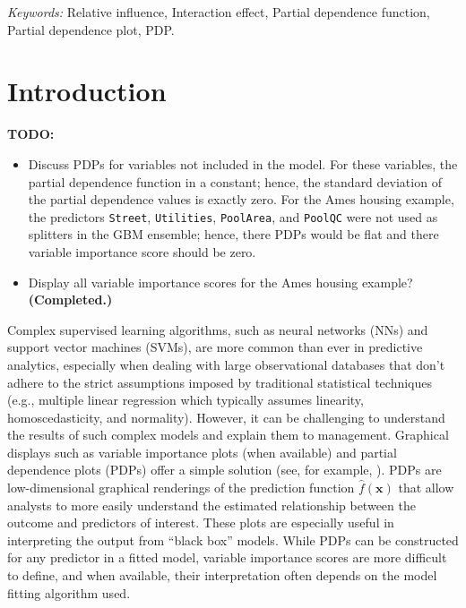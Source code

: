 \documentclass[12pt]{article}
\def\code#1{\texttt{#1}}
\begin{document}
\noindent%
{\it Keywords:} Relative influence, Interaction effect, Partial dependence function, Partial dependence plot, PDP.
\vfill

\newpage
{} %


\section{Introduction}
\label{sec:introduction}

\textbf{TODO:}
\begin{itemize}
  \item Discuss PDPs for variables not included in the model. For these variables, the partial dependence function in a constant; hence, the standard deviation of the partial dependence values is exactly zero. For the Ames housing example, the predictors \code{Street}, \code{Utilities}, \code{PoolArea}, and \code{PoolQC} were not used as splitters in the GBM ensemble; hence, there PDPs would be flat and there variable importance score should be zero.
  \item Display all variable importance scores for the Ames housing example? \textbf{(Completed.)}
\end{itemize}


Complex supervised learning algorithms, such as neural networks (NNs) and support vector machines (SVMs), are more common than ever in predictive analytics, especially when dealing with large observational databases that don't adhere to the strict assumptions imposed by traditional statistical techniques (e.g., multiple linear regression which typically assumes linearity, homoscedasticity, and normality). However, it can be challenging to understand the results of such complex models and explain them to management. Graphical displays such as variable importance plots (when available) and partial dependence plots (PDPs) \citep{friedman-2001-greedy} offer a simple solution (see, for example, \citep[pp. 367--380]{hastie-elements-2009}). PDPs are low-dimensional graphical renderings of the prediction function $\widehat{f}\left(\boldsymbol{x}\right)$ that allow analysts to more easily understand the estimated relationship between the outcome and predictors of interest. These plots are especially useful in interpreting the output from ``black box'' models. While PDPs can be constructed for any predictor in a fitted model, variable importance scores are more difficult to define, and when available, their interpretation often depends on the model fitting algorithm used. 
\end{document}
